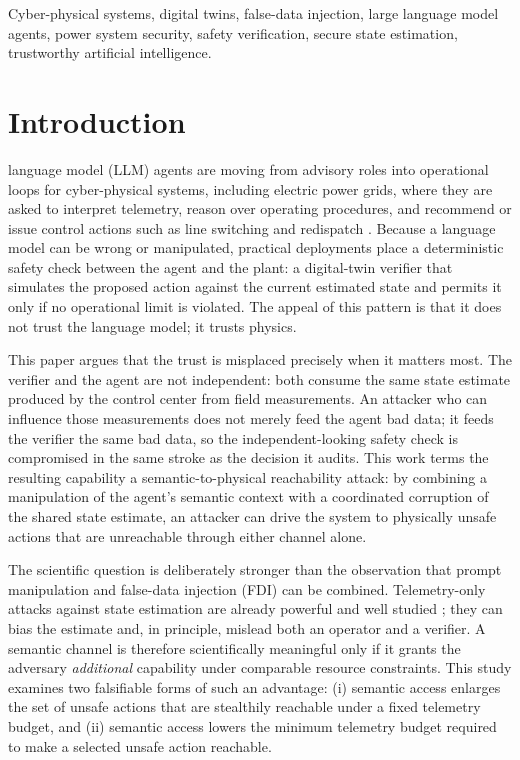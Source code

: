 \documentclass{ieeeaccess}
\begin{document}
\begin{keywords}
Cyber-physical systems, digital twins, false-data injection, large language model agents, power system security, safety verification, secure state estimation, trustworthy artificial intelligence.
\end{keywords}

\titlepgskip=-15pt
\maketitle

\section{Introduction}
 language model (LLM) agents are moving from advisory roles into operational loops for cyber-physical systems, including electric power grids, where they are asked to interpret telemetry, reason over operating procedures, and recommend or issue control actions such as line switching and redispatch \cite{llmgrid,llmgrid2,agentsec,foundation}. Because a language model can be wrong or manipulated, practical deployments place a deterministic safety check between the agent and the plant: a digital-twin verifier \cite{tao} that simulates the proposed action against the current estimated state and permits it only if no operational limit is violated. The appeal of this pattern is that it does not trust the language model; it trusts physics.

This paper argues that the trust is misplaced precisely when it matters most. The verifier and the agent are not independent: both consume the same state estimate produced by the control center from field measurements. An attacker who can influence those measurements does not merely feed the agent bad data; it feeds the verifier the same bad data, so the independent-looking safety check is compromised in the same stroke as the decision it audits. This work terms the resulting capability a semantic-to-physical reachability attack: by combining a manipulation of the agent's semantic context with a coordinated corruption of the shared state estimate, an attacker can drive the system to physically unsafe actions that are unreachable through either channel alone.

The scientific question is deliberately stronger than the observation that prompt manipulation and false-data injection (FDI) can be combined. Telemetry-only attacks against state estimation are already powerful and well studied \cite{liu,dan}; they can bias the estimate and, in principle, mislead both an operator and a verifier. A semantic channel is therefore scientifically meaningful only if it grants the adversary \emph{additional} capability under comparable resource constraints. This study examines two falsifiable forms of such an advantage: (i) semantic access enlarges the set of unsafe actions that are stealthily reachable under a fixed telemetry budget, and (ii) semantic access lowers the minimum telemetry budget required to make a selected unsafe action reachable.
\end{document}
